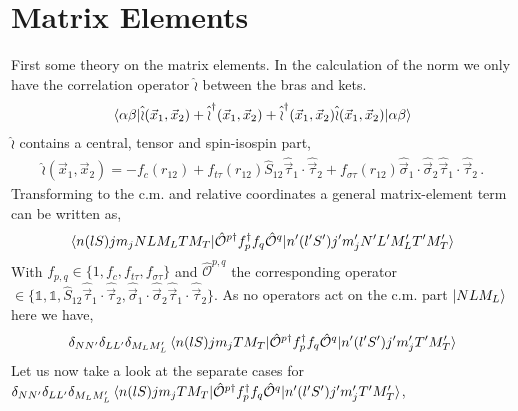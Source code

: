 \documentclass[10pt]{article}
\begin{document}
\section{Matrix Elements}
First some theory on the matrix elements. In the calculation of the norm we only have the correlation operator $\hat{\wr}$ between the bras and kets.
\begin{align}\label{eq:norm}
	\braket{ \alpha \beta |\hat{\wr}(\vec{x}_{1},\vec{x}_{2}) + \hat{\wr}^{\dagger}(\vec{x}_{1},\vec{x}_{2}) + \hat{\wr}^{\dagger}(\vec{x}_{1},\vec{x}_{2})\hat{\wr}(\vec{x}_{1},\vec{x}_{2}) | \alpha \beta}
\end{align}
$\hat{\wr}$ contains a central, tensor and spin-isospin part,
\begin{align*}
	\hat{\wr}(\vec{x}_{1},\vec{x}_{2}) = -f_c(r_{12}) + f_{t\tau}(r_{12}) \hat{S}_{12} \hat{\vec{\tau}}_{1} \cdot \hat{\vec{\tau}}_{2} + f_{\sigma \tau}(r_{12}) \hat{ \vec{\sigma}}_{1} \cdot \hat{ \vec{\sigma}}_{2} \hat{ \vec{\tau}}_{1} \cdot \hat{ \vec{\tau}}_{2}  \, .
\end{align*}
Transforming to the c.m. and relative coordinates a general matrix-element term can be written as,
\begin{align*}
	\braket{ n (l S) j m_j N L M_L T M_T |  \hat{\mathcal{O}}^{p\dagger} f^{\dagger}_{p} f_{q} \hat{\mathcal{O}}^{q} | n' (l' S') j' m_j' N' L' M_L' T' M_T'} 
\end{align*}
With $f_{p,q} \in \{ 1, f_{c}, f_{t\tau}, f_{\sigma \tau} \}$ and $\hat{\mathcal{O}}^{p,q}$ the corresponding operator $\in \{ \mathbb{1}, \mathbb{1},  \hat{S}_{12} \hat{\vec{\tau}}_{1} \cdot \hat{\vec{\tau}}_{2}, \hat{ \vec{\sigma}}_{1} \cdot \hat{ \vec{\sigma}}_{2} \hat{ \vec{\tau}}_{1} \cdot \hat{ \vec{\tau}}_{2} \} $.
As no operators act on the c.m. part $ \ket{ N L M_L}$ here we have,
\begin{align*}
	\delta_{NN'} \delta_{LL'} \delta_{M_L M_L'} \braket{ n (l S) j m_j T M_T |  \hat{\mathcal{O}}^{p\dagger} f^{\dagger}_{p} f_{q} \hat{\mathcal{O}}^{q} | n' (l' S') j' m_j' T' M_T'}  
\end{align*}
Let us now take a look at the separate cases for $\delta_{NN'} \delta_{LL'} \delta_{M_L M_L'} \braket{ n (l S) j m_j T M_T |  \hat{\mathcal{O}}^{p\dagger} f^{\dagger}_{p} f_{q} \hat{\mathcal{O}}^{q} | n' (l' S') j' m_j' T' M_T'} $,
\end{document}
